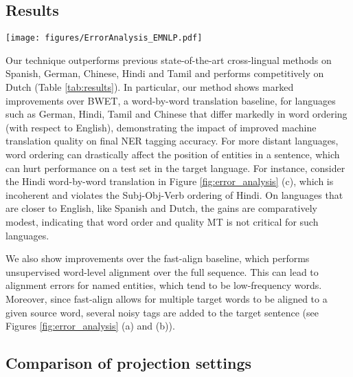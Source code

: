 \documentclass[11pt,a4paper]{article}
\begin{document}
\subsection{Results}
\label{sec:results}
\begin{figure*}
    \centering
    \texttt{[image: figures/ErrorAnalysis\_EMNLP.pdf]}
    \caption{Examples of different errors (details in individual captions).}
\label{fig:error_analysis}
\end{figure*}

Our technique outperforms previous state-of-the-art cross-lingual methods 
on Spanish, German, Chinese, Hindi and Tamil 
and performs competitively on Dutch (Table \ref{tab:results}). In particular, our method shows marked improvements over BWET, 
a word-by-word translation baseline, for languages 
such as German, Hindi, Tamil and Chinese 
that differ markedly in word ordering (with respect to English), 
demonstrating the impact of improved machine translation quality 
on final NER tagging accuracy. 
For more distant languages, word ordering can drastically affect the position of entities in a sentence,
which can hurt performance on a test set in the target language.
For instance, consider the Hindi word-by-word translation in Figure \ref{fig:error_analysis} (c), 
which is incoherent and violates the Subj-Obj-Verb ordering of Hindi. On languages that are closer to English, like Spanish and Dutch, 
the gains are comparatively modest,
indicating that word order and quality MT is not critical for such languages.


We also show improvements over the fast-align baseline, which performs unsupervised 
word-level alignment over the full sequence.
This can lead to alignment errors for named entities, 
which tend to be low-frequency words. 
Moreover, since fast-align allows 
for  multiple target words to be aligned to a given source word, 
several noisy tags are added to the target sentence 
(see Figures \ref{fig:error_analysis} (a) and (b)). 

















%
 
\subsection{Comparison of projection settings} 
\end{document}

